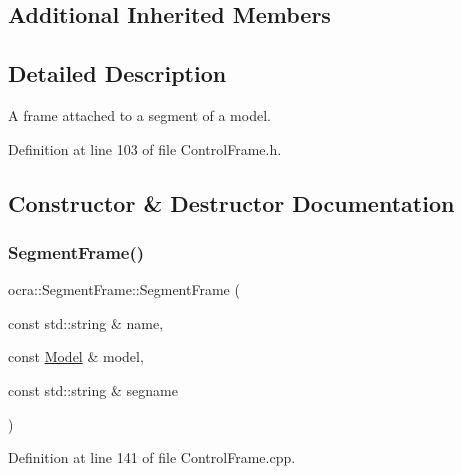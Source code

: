\subsection*{Additional Inherited Members}


\subsection{Detailed Description}
A frame attached to a segment of a model. 

Definition at line 103 of file Control\+Frame.\+h.



\subsection{Constructor \& Destructor Documentation}
\hypertarget{classocra_1_1SegmentFrame_ab05987e2ecc0f904c905b9e66269ce84}{}\label{classocra_1_1SegmentFrame_ab05987e2ecc0f904c905b9e66269ce84} 
\subsubsection{\texorpdfstring{Segment\+Frame()}{SegmentFrame()}\hspace{0.1cm}{\footnotesize\ttfamily [1/4]}}
{\footnotesize\ttfamily ocra\+::\+Segment\+Frame\+::\+Segment\+Frame (\begin{DoxyParamCaption}\item[{const std\+::string \&}]{name,  }\item[{const \hyperlink{classocra_1_1Model}{Model} \&}]{model,  }\item[{const std\+::string \&}]{segname }\end{DoxyParamCaption})}



Definition at line 141 of file Control\+Frame.\+cpp.

\hypertarget{classocra_1_1SegmentFrame_ad9cd47c330239c77e913d38029af808d}{}\label{classocra_1_1SegmentFrame_ad9cd47c330239c77e913d38029af808d} 
